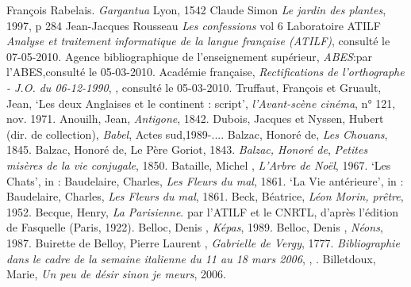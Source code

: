 \begin{bibitemlist}{1}
 François Rabelais. \textit{Gargantua} Lyon, 1542
 Claude Simon \textit{Le jardin des plantes}, 1997, p 284
 Jean-Jacques Rousseau \textit{Les confessions} vol 6
 Laboratoire ATILF \textit{Analyse et traitement informatique de la langue française (ATILF)}, consulté le 07-05-2010.
 Agence bibliographique de l'enseignement supérieur, \textit{ABES}:par l'ABES,consulté le 05-03-2010.
 Académie française, \textit{Rectifications de l'orthographe - J.O. du 06-12-1990}, , consulté le 05-03-2010.
 Truffaut, François et Gruault, Jean, ‘Les deux Anglaises et le continent : script’, \textit{l'Avant-scène cinéma}, n° 121, nov. 1971.
 Anouilh, Jean, \textit{Antigone}, 1842.
 Dubois, Jacques et Nyssen, Hubert (dir. de collection), \textit{Babel}, Actes sud,1989-....
 Balzac, Honoré de, \textit{Les Chouans}, 1845.
 Balzac, Honoré de, Le Père Goriot, 1843.
 \textit{Balzac, Honoré de}, \textit{Petites misères de la vie conjugale}, 1850.
 Bataille, Michel , \textit{L'Arbre de Noël}, 1967.
 ‘Les Chats’, in : Baudelaire, Charles, \textit{Les Fleurs du mal}, 1861.
 ‘La Vie antérieure’, in : Baudelaire, Charles, \textit{Les Fleurs du mal}, 1861.
 Beck, Béatrice, \textit{Léon Morin, prêtre}, 1952.
 Becque, Henry, \textit{La Parisienne}.  par l'ATILF et le CNRTL, d'après l'édition de Fasquelle (Paris, 1922).
 Belloc, Denis , \textit{Képas}, 1989.
 Belloc, Denis , \textit{Néons}, 1987.
 Buirette de Belloy, Pierre Laurent , \textit{Gabrielle de Vergy}, 1777.
 \textit{Bibliographie dans le cadre de la semaine italienne du 11 au 18 mars 2006}, , .
 Billetdoux, Marie, \textit{Un peu de désir sinon je meurs}, 2006.

\end{bibitemlist}
